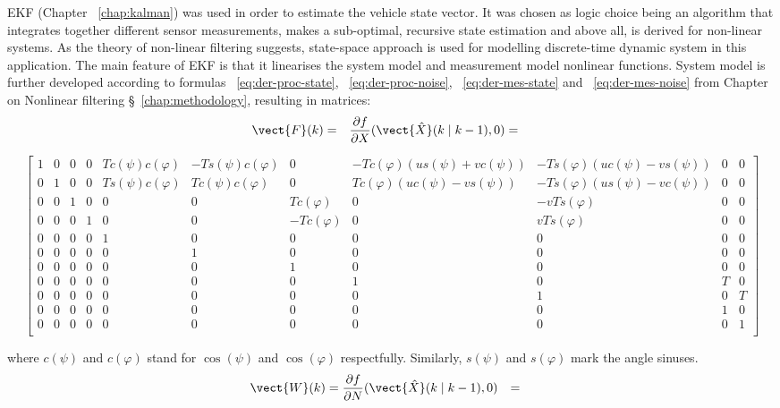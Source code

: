 EKF (Chapter ~\ref{chap:kalman}) was used in order to estimate the vehicle state vector. It was chosen as logic choice being an algorithm that integrates together different sensor measurements, makes a sub-optimal, recursive state estimation and above all, is derived for non-linear systems. As the theory of non-linear filtering suggests, state-space approach is used for modelling discrete-time dynamic system in this application. The main feature of EKF is that it linearises the system model and measurement model nonlinear functions. System model is further developed according to formulas ~\ref{eq:der-proc-state}, ~\ref{eq:der-proc-noise}, ~\ref{eq:der-mes-state} and ~\ref{eq:der-mes-noise} from Chapter on Nonlinear filtering \S~\ref{chap:methodology}, resulting in matrices:
\begin{align*}
\vect{F}(k) & = &  \frac{\partial f}{\partial X} (\vect{\hat{X}}(k \mid k-1), 0) & = & 
\end{align*}
\begin{footnotesize}
$$ \left[ 
\begin{array}{ccccccccccc}
1 & 0 & 0 & 0 & T c(\psi) c(\varphi) & -T s(\psi) c(\varphi) & 0 & -Tc(\varphi)(us(\psi)+vc(\psi)) & -Ts(\varphi)(uc(\psi)-vs(\psi)) & 0 & 0 \\
0 & 1 & 0 & 0 & T s(\psi) c(\varphi) & T c(\psi) c(\varphi) & 0 & Tc(\varphi)(uc(\psi)-vs(\psi)) & -Ts(\varphi)(us(\psi)-vc(\psi))  & 0 & 0 \\
0 & 0 & 1 & 0 & 0 & 0 &  Tc(\varphi) & 0 & -vTs(\varphi) & 0 & 0 \\
0 & 0 & 0 & 1 & 0 & 0 & -Tc(\varphi) & 0 &  vTs(\varphi) & 0 & 0 \\
0 & 0 & 0 & 0 & 1 & 0 & 0 & 0 & 0 & 0 & 0 \\
0 & 0 & 0 & 0 & 0 & 1 & 0 & 0 & 0 & 0 & 0 \\
0 & 0 & 0 & 0 & 0 & 0 & 1 & 0 & 0 & 0 & 0 \\
0 & 0 & 0 & 0 & 0 & 0 & 0 & 1 & 0 & T & 0 \\
0 & 0 & 0 & 0 & 0 & 0 & 0 & 0 & 1 & 0 & T \\
0 & 0 & 0 & 0 & 0 & 0 & 0 & 0 & 0 & 1 & 0 \\
0 & 0 & 0 & 0 & 0 & 0 & 0 & 0 & 0 & 0 & 1 \\
\end{array}
\right] $$ 
\end{footnotesize}
where $c(\psi)$ and $c(\varphi)$ stand for $\cos(\psi)$ and $\cos(\varphi)$ respectfully. Similarly, $s(\psi)$ and $s(\varphi)$ mark the angle sinuses.  
\begin{align*}
\vect{W}(k) & = \frac{\partial f}{\partial N} (\vect{\hat{X}}(k \mid k-1), 0) & = &
\end{align*}
